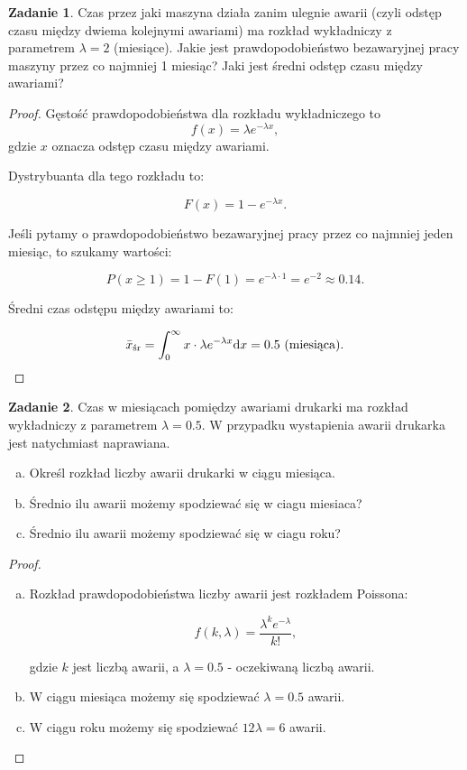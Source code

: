 \documentclass[11pt]{article}
\theoremstyle{definition}
\newtheorem{zadanie}{Zadanie}
\numberwithin{zadanie}{section}
\begin{document}
\begin{zadanie}
    Czas przez jaki maszyna działa zanim ulegnie awarii (czyli odstęp czasu między dwiema kolejnymi awariami) ma
    rozkład wykładniczy z parametrem $\lambda = 2$ (miesiące). Jakie jest prawdopodobieństwo bezawaryjnej pracy maszyny
    przez co najmniej 1 miesiąc? Jaki jest średni odstęp czasu między awariami?
\end{zadanie}
\begin{proof}
    Gęstość prawdopodobieństwa dla rozkładu wykładniczego to
    $$f(x)=\lambda e^{-\lambda x},$$ gdzie $x$ oznacza odstęp czasu między awariami.

    Dystrybuanta dla tego rozkładu to:

    $$F(x) = 1-e^{-\lambda x}.$$

    Jeśli pytamy o prawdopodobieństwo bezawaryjnej pracy przez co najmniej jeden miesiąc, to szukamy wartości:

    $$P(x\geq 1) = 1- F(1) = e^{-\lambda\cdot 1} = e^{-2} \approx 0.14.$$

    Średni czas odstępu między awariami to:

    $$\bar x_{\text{śr}} = \int_0^\infty x\cdot \lambda e^{-\lambda x}\text dx = 0.5\text{ }(\text{miesiąca}).$$
\end{proof}

\begin{zadanie}
    Czas w miesiącach pomiędzy awariami drukarki ma rozkład wykładniczy z parametrem $\lambda = 0.5$. W przypadku
    wystapienia awarii drukarka jest natychmiast naprawiana.

    \begin{enumerate}[a)]
        \item Określ rozkład liczby awarii drukarki w ciągu miesiąca.
        \item Średnio ilu awarii możemy spodziewać się w ciagu miesiaca?
        \item Średnio ilu awarii możemy spodziewać się w ciagu roku?
    \end{enumerate}
\end{zadanie}
\begin{proof}
    \begin{enumerate}[a)]
        \item Rozkład prawdopodobieństwa liczby awarii jest rozkładem Poissona:

              $$f(k,\lambda) = \frac{\lambda^ke^{-\lambda}}{k!},$$

              gdzie $k$ jest liczbą awarii, a $\lambda=0.5$ - oczekiwaną liczbą awarii.

        \item W ciągu miesiąca możemy się spodziewać $\lambda=0.5$ awarii.

        \item W ciągu roku możemy się spodziewać $12\lambda = 6$ awarii.
    \end{enumerate}
\end{proof}
\end{document}
